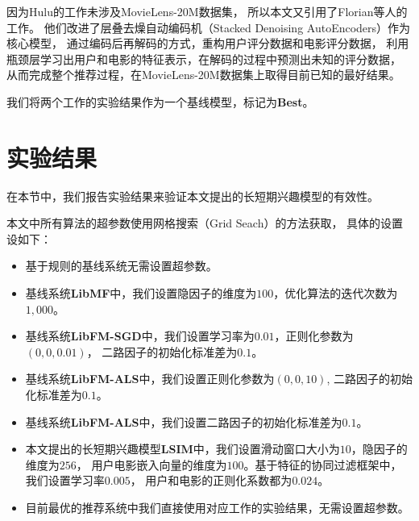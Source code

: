 因为Hulu的工作未涉及MovieLens-20M数据集，
所以本文又引用了Florian等人\parencite{strub2016hybrid}的工作。
他们改进了层叠去燥自动编码机（Stacked Denoising AutoEncoders）作为核心模型，
通过编码后再解码的方式，重构用户评分数据和电影评分数据，
利用瓶颈层学习出用户和电影的特征表示，在解码的过程中预测出未知的评分数据，
从而完成整个推荐过程，在MovieLens-20M数据集上取得目前已知的最好结果。

我们将两个工作的实验结果作为一个基线模型，标记为\textbf{Best}。

\section{实验结果}
在本节中，我们报告实验结果来验证本文提出的长短期兴趣模型的有效性。

本文中所有算法的超参数使用网格搜索（Grid Seach）的方法获取，
具体的设置设如下：
\begin{itemize}
\item
基于规则的基线系统无需设置超参数。
\item
基线系统\textbf{LibMF}中，我们设置隐因子的维度为$100$，优化算法的迭代次数为$1,000$。
\item
基线系统\textbf{LibFM-SGD}中，我们设置学习率为$0.01$，正则化参数为$(0,0,0.01)$，
二路因子的初始化标准差为$0.1$。
\item
基线系统\textbf{LibFM-ALS}中，我们设置正则化参数为$(0,0,10)$,
二路因子的初始化标准差为$0.1$。
\item
基线系统\textbf{LibFM-ALS}中，我们设置二路因子的初始化标准差为$0.1$。
\item
本文提出的长短期兴趣模型\textbf{LSIM}中，我们设置滑动窗口大小为$10$，隐因子的维度为$256$，
用户电影嵌入向量的维度为$100$。基于特征的协同过滤框架中，我们设置学习率$0.005$，
用户和电影的正则化系数都为$0.024$。
\item
目前最优的推荐系统中我们直接使用对应工作的实验结果，无需设置超参数。
\end{itemize}

